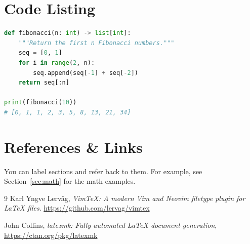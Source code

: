 \documentclass[12pt, a4paper]{article}
\begin{document}
\section{Code Listing}

\begin{lstlisting}[language=Python, caption={A simple Python example}]
def fibonacci(n: int) -> list[int]:
    """Return the first n Fibonacci numbers."""
    seq = [0, 1]
    for i in range(2, n):
        seq.append(seq[-1] + seq[-2])
    return seq[:n]

print(fibonacci(10))
# [0, 1, 1, 2, 3, 5, 8, 13, 21, 34]
\end{lstlisting}

\section{References \& Links}

You can label sections and refer back to them. For example, see
Section~\ref{sec:math} for the math examples.

\begin{thebibliography}{9}
    Karl Yngve Lervåg,
    \textit{VimTeX: A modern Vim and Neovim filetype plugin for LaTeX files}.
    \url{https://github.com/lervag/vimtex}

    John Collins,
    \textit{latexmk: Fully automated LaTeX document generation},
    \url{https://ctan.org/pkg/latexmk}
\end{thebibliography}

\end{document}
